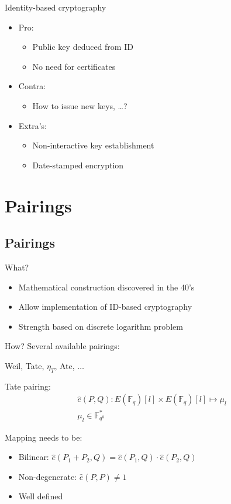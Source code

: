 \documentclass[svgnames, handout,t]{beamer}
\begin{document}
\begin{frame}{Identity-based cryptography}
	\begin{itemize}
		\item Pro:
			\begin{itemize}
				\item Public key deduced from ID
				\item No need for certificates
			\end{itemize}
		\item Contra:
			\begin{itemize}
				\item How to issue new keys, \ldots ?
			\end{itemize}
		\item Extra's:
			\begin{itemize}
				\item Non-interactive key establishment
				\item Date-stamped encryption
			\end{itemize}
	\end{itemize}
\end{frame}

\section{Pairings}
\subsection*{Pairings}
\begin{frame}{What?}
	\begin{itemize}
		\item Mathematical construction discovered in the 40's
		\item Allow implementation of ID-based cryptography
		\item Strength based on discrete logarithm problem
	\end{itemize}
\end{frame}

\begin{frame}{How?}
	Several available pairings:
	\begin{center}Weil, \alert{Tate}, $\eta _T$, Ate, $\ldots$\end{center}
	
	Tate pairing:	
	\[\begin{gathered}
		\hat{e}(P, Q) : E(\mathbb{F}_q)[l] \times E(\mathbb{F}_q)[l] \mapsto \mu _l \\
		\mu _l \in 	\mathbb{F}_{q^k}^*
	\end{gathered}\]
	
	Mapping needs to be:	
	\begin{itemize}
		\item Bilinear: $\hat{e}(P_1 + P_2, Q) = \hat{e}(P_1, Q) \cdot \hat{e}(P_2, Q)$
		\item Non-degenerate: $\hat{e}(P, P) \neq 1$
		\item Well defined
	\end{itemize}
\end{frame}
\end{document}
